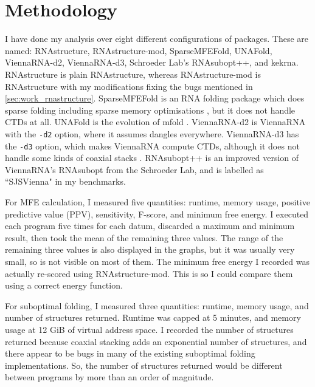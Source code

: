 \documentclass{cshonours}
\begin{document}
\section{Methodology}
I have done my analysis over eight different configurations of packages. These are named:  RNAstructure, RNAstructure-mod, SparseMFEFold, UNAFold, ViennaRNA-d2, ViennaRNA-d3, Schroeder Lab's RNAsubopt++, and kekrna. RNAstructure is plain RNAstructure, whereas RNAstructure-mod is RNAstructure with my modifications fixing the bugs mentioned in \autoref{sec:work_rnastructure}. SparseMFEFold is an RNA folding package which does sparse folding including sparse memory optimisations \cite{willSparseFolding}, but it does not handle CTDs at all. UNAFold is the evolution of mfold \cite{unafold}. ViennaRNA-d2 is ViennaRNA \cite{viennarna} with the \texttt{-d2} option, where it assumes dangles everywhere. ViennaRNA-d3 has the \texttt{-d3} option, which makes ViennaRNA compute CTDs, although it does not handle some kinds of coaxial stacks \cite{viennaBroken}. RNAsubopt++ is an improved version of ViennaRNA's RNAsubopt from the Schroeder Lab, and is labelled as ``SJSVienna" in my benchmarks.

For MFE calculation, I measured five quantities: runtime, memory usage, positive predictive value (PPV), sensitivity, F-score, and minimum free energy. I executed each program five times for each datum, discarded a maximum and minimum result, then took the mean of the remaining three values. The range of the remaining three values is also displayed in the graphs, but it was usually very small, so is not visible on most of them. The minimum free energy I recorded was actually re-scored using RNAstructure-mod. This is so I could compare them using a correct energy function.

For suboptimal folding, I measured three quantities: runtime, memory usage, and number of structures returned. Runtime was capped at 5 minutes, and memory usage at 12 GiB of virtual address space. I recorded the number of structures returned because coaxial stacking adds an exponential number of structures, and there appear to be bugs in many of the existing suboptimal folding implementations. So, the number of structures returned would be different between programs by more than an order of magnitude.
\end{document}
